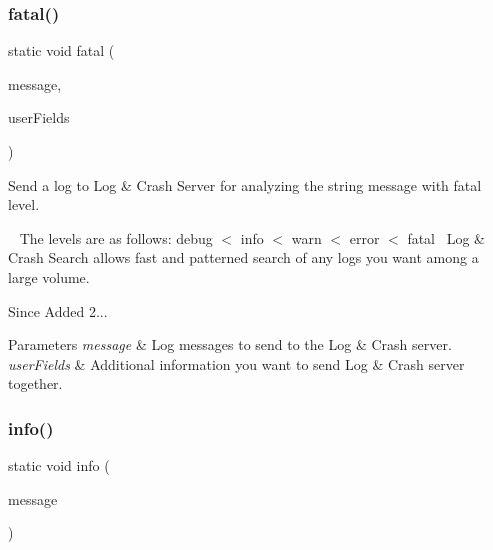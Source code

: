 \subsubsection{\texorpdfstring{fatal()}{fatal()}\hspace{0.1cm}{\footnotesize\ttfamily [3/3]}}
{\footnotesize\ttfamily static void fatal (\begin{DoxyParamCaption}\item[{@Non\+Null final String}]{message,  }\item[{@Non\+Null final Map$<$ String, String $>$}]{user\+Fields }\end{DoxyParamCaption})\hspace{0.3cm}{\ttfamily [static]}}



Send a log to Log \& Crash Server for analyzing the string message with fatal level. 

~\newline
 The levels are as follows\+: debug $<$ info $<$ warn $<$ error $<$ fatal~\newline
 Log \& Crash Search allows fast and patterned search of any logs you want among a large volume.

\begin{DoxySince}{Since}
Added 2... 
\end{DoxySince}

\begin{DoxyParams}{Parameters}
{\em message} & Log messages to send to the Log \& Crash server. \\
\hline
{\em user\+Fields} & Additional information you want to send Log \& Crash server together. \\
\hline
\end{DoxyParams}
\mbox{\label{classcom_1_1toast_1_1android_1_1gamebase_1_1_gamebase_1_1_logger_aa09d8515b3f516eb6ca6b3685ffe08a9}} 
\subsubsection{\texorpdfstring{info()}{info()}\hspace{0.1cm}{\footnotesize\ttfamily [1/3]}}
{\footnotesize\ttfamily static void info (\begin{DoxyParamCaption}\item[{@Non\+Null final String}]{message }\end{DoxyParamCaption})\hspace{0.3cm}{\ttfamily [static]}}



